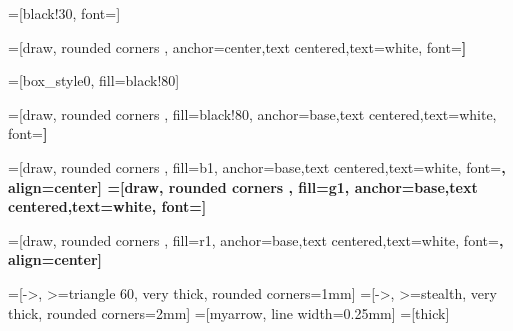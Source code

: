 

\newcommand{\txw}{\textwidth}
\newcommand{\txh}{\textheight}
\newcommand{\midX}{0.5\textwidth}
\newcommand{\midY}{0.5\textheight}
\newcommand{\drawBorder}{\draw[clrBorders] (1.25mm,1.25mm) rectangle (\txw-1.25mm,\txh-1.25mm) ;}






\newcommand{\xPageNumber}{105mm}
\newcommand{\yPageNumber}{3mm}
=[black!30, font=\small]
\newcommand{\nodePageNumber}{ \node[stylePageNumber] at (\xPageNumber, \yPageNumber) {\insertframenumber} ; }

=[draw, rounded corners ,
anchor=center,text centered,text=white, font=\bfseries] %

=[box_style0, fill=black!80] %

=[draw, rounded corners , fill=black!80,
anchor=base,text centered,text=white, font=\bfseries] %

=[draw, rounded corners , fill=b1,
anchor=base,text centered,text=white, font=\bfseries, align=center] %
=[draw, rounded corners , fill=g1,
anchor=base,text centered,text=white, font=\bfseries] %

=[draw, rounded corners , fill=r1,
anchor=base,text centered,text=white, font=\bfseries, align=center] %

=[->, >=triangle 60, very thick, rounded corners=1mm]
=[->, >=stealth, very thick, rounded corners=2mm]
=[myarrow, line width=0.25mm]
=[thick]





\usepackage[cm]{sfmath}
\renewcommand\dot[1]{\text{\stackon[1pt]{$#1$}{.}}}

